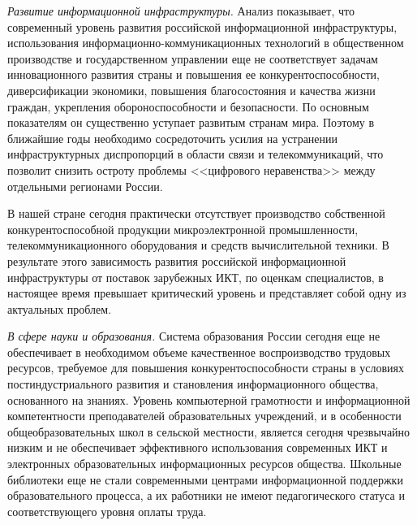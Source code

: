 \begin{multicols}{2}
   \vspace*{1pt}
   \textit{Развитие информационной инфраструктуры.} Анализ показывает, что
современный уровень развития российской информационной инфраструктуры,
использования информационно-ком\-му\-ни\-ка\-ци\-он\-ных технологий в общественном
производстве и государственном управлении еще не соответствует задачам
инновационного развития страны и повышения ее конкурентоспособности,
диверсификации экономики, повышения благосостояния и качества жизни граждан,
укрепления обороноспособности и безопасности. По основным показателям он
существенно уступает развитым странам мира. Поэтому в ближайшие годы необходимо
сосредоточить усилия на устранении инфраструктурных диспропорций в области связи и
телекоммуникаций, что позволит снизить остроту проблемы <<цифрового неравенства>>
между отдельными регионами России.

   В нашей стране сегодня практически отсутствует производство собственной
конкурентоспособной продукции микроэлектронной промышленности,
телекоммуникационного оборудования и средств вычислительной техники. В результате
этого зависимость развития российской информационной инфраструктуры от поставок
зарубежных ИКТ, по оценкам специалистов, в настоящее время превышает критический
уровень и представляет собой одну из актуальных проблем.

   \vspace*{1pt}
   \textit{В сфере науки и образования.} Система образования России сегодня еще не
обеспечивает в необходимом объеме качественное воспроизводство трудовых ресурсов,
требуемое для повышения конкурентоспособности страны в условиях
пост\-ин\-дуст\-ри\-аль\-но\-го развития и становления информационного общества, основанного
на знаниях. %
Уровень компьютерной грамотности и информационной компетентности
преподавателей об\-ра\-зова\-тель\-ных учреждений, и в особенности об\-ще\-об\-ра\-зо\-ва\-тель\-ных
школ в сельской местности, %
яв\-ля\-ется сегодня чрезвычайно низким и не обеспечивает
эффективного использования современных ИКТ и электронных образовательных
информационных ресурсов общества. Школьные библиотеки еще не стали современными
центрами информационной поддержки образовательного процесса, а их работники не
имеют педагогического статуса и соответствующего уровня оплаты труда.


\end{multicols}
